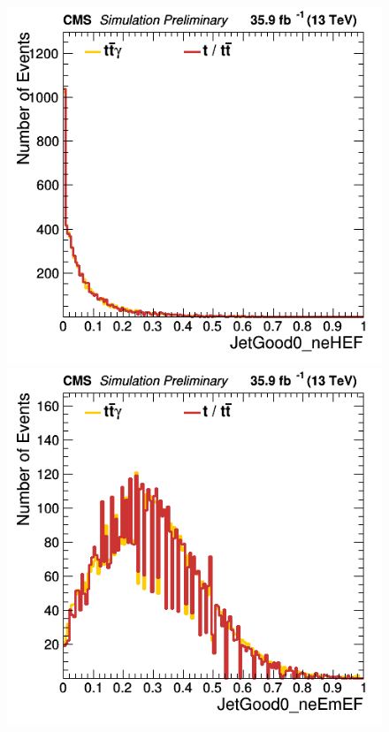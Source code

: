 \documentclass[11pt]{scrartcl}
\begin{document}
	\begin{figure}[H]
	\centering
	\begin{minipage}{.5\textwidth}
	  \centering
	  \includegraphics[width=0.7\linewidth]{figures/Notused/JetGood0_neHEF.png}
	\end{minipage}%
	\begin{minipage}{.5\textwidth}
	  \centering
	  \includegraphics[width=0.7\linewidth]{figures/Notused/JetGood0_neEmEF.png}
	\end{minipage}
	\end{figure}
	
\end{document}
